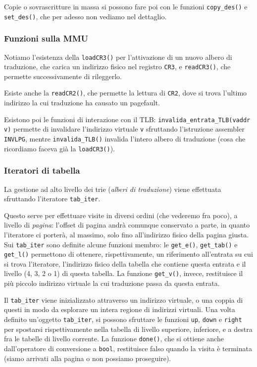 \documentclass[a4paper,11pt]{article}
\begin{document}
Copie o sovrascritture in massa si possono fare poi con le funzioni \lstinline|copy_des()| e \lstinline|set_des()|, che per adesso non vediamo nel dettaglio.

\subsubsection{Funzioni sulla MMU}
Notiamo l'esistenza della \lstinline|loadCR3()| per l'attivazione di un nuovo albero di traduzione, che carica un indirizzo fisico nel registro \lstinline|CR3|, e \lstinline|readCR3()|, che permette successivamente di rileggerlo.

Esiste anche la \lstinline|readCR2()|, che permette la lettura di \lstinline|CR2|, dove si trova l'ultimo indirizzo la cui traduzione ha causato un pagefault.

Esistono poi le funzioni di interazione con il TLB: \lstinline|invalida_entrata_TLB(vaddr v)| permette di invalidare l'indirizzo virtuale \lstinline|v| sfruttando l'istruzione assembler \lstinline|INVLPG|, mentre \lstinline|invalida_TLB()| invalida l'intero albero di traduzione (cosa che ricordiamo faceva già la \lstinline|loadCR3()|).

\subsubsection{Iteratori di tabella}
La gestione ad alto livello dei trie (\textit{alberi di traduzione}) viene effettuata sfruttando l'iteratore \lstinline|tab_iter|.

Questo serve per effettuare visite in diversi ordini (che vederemo fra poco), a livello di \textit{pagina}: l'offset di pagina andrà comunque conservato a parte, in quanto l'iteratore ci porterà, al massimo, solo fino all'indirizzo fisico della pagina giusta.
Sui \lstinline|tab_iter| sono definite alcune funzioni membro: le \lstinline|get_e()|, \lstinline|get_tab()| e \lstinline|get_l()| permettono di ottenere, rispettivamente, un riferimento all’entrata su cui si trova l’iteratore, l’indirizzo fisico della tabella che contiene questa entrata e il livello (4, 3, 2 o 1) di questa tabella. 
La funzione \lstinline|get_v()|, invece, restituisce il più piccolo indirizzo virtuale la cui traduzione passa da questa entrata.

Il \lstinline|tab_iter| viene inizializzato attraverso un indirizzo virtuale, o una coppia di questi in modo da esplorare un intera regione di indirizzi virtuali.
Una volta definito un'oggetto \lstinline|tab_iter|, si possono sfruttare le funzioni \lstinline|up|, \lstinline|down| e \lstinline|right| per spostarsi rispettivamente nella tabella di livello superiore, inferiore, e a destra fra le tabelle di livello corrente.
La funzione \lstinline|done()|, che si ottiene anche dall'operatore di conversione a \lstinline|bool|, restituisce falso quando la visita è terminata (siamo arrivati alla pagina o non possiamo proseguire).
\end{document}
